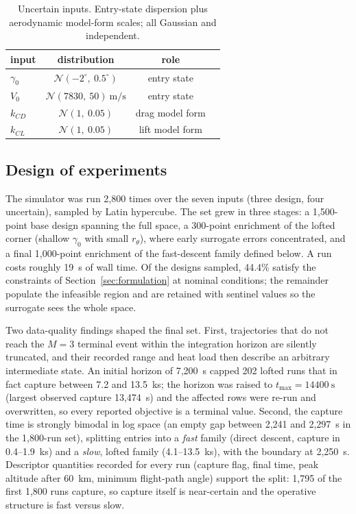 \begin{table}[htbp]
\centering
\caption{Uncertain inputs. Entry-state dispersion plus aerodynamic
model-form scales; all Gaussian and independent.}
\label{tab:uncert}
\begin{tabular}{lccl}
\toprule
input & distribution & role \\
\midrule
$\gamma_0$ & $\mathcal{N}(-2^\circ,\ 0.5^\circ)$ & entry state \\
$V_0$      & $\mathcal{N}(7830,\ 50)\ \si{\metre\per\second}$ & entry state \\
$k_{CD}$   & $\mathcal{N}(1,\ 0.05)$ & drag model form \\
$k_{CL}$   & $\mathcal{N}(1,\ 0.05)$ & lift model form \\
\bottomrule
\end{tabular}
\end{table}

\subsection{Design of experiments}
\label{sec:doe}

The simulator was run 2{,}800 times over the seven inputs (three design,
four uncertain), sampled by Latin hypercube. The set grew in three stages: a
1{,}500-point base design spanning the full space, a 300-point enrichment of
the lofted corner (shallow $\gamma_0$ with small $r_\theta$), where early
surrogate errors concentrated, and a final 1{,}000-point enrichment of the
fast-descent family defined below. A run costs roughly 19~s of wall time.
Of the designs sampled, 44.4\% satisfy the constraints of
Section~\ref{sec:formulation} at nominal conditions; the remainder populate
the infeasible region and are retained with sentinel values so the surrogate
sees the whole space.

Two data-quality findings shaped the final set. First, trajectories that do
not reach the $M=3$ terminal event within the integration horizon are
silently truncated, and their recorded range and heat load then describe an
arbitrary intermediate state. An initial horizon of 7{,}200~s capped 202
lofted runs that in fact capture between 7.2 and 13.5~ks; the horizon was
raised to $t_{\max}=\SI{14400}{\s}$ (largest observed capture 13{,}474~s)
and the affected rows were re-run and overwritten, so every reported
objective is a terminal value. Second, the capture time is strongly bimodal
in log space (an empty gap between 2{,}241 and 2{,}297~s in the 1{,}800-run
set), splitting entries into a \emph{fast} family (direct descent, capture
in 0.4--1.9~ks) and a \emph{slow}, lofted family (4.1--13.5~ks), with the
boundary at 2{,}250~s. Descriptor quantities recorded for every run (capture
flag, final time, peak altitude after 60~km, minimum flight-path angle)
support the split: 1{,}795 of the first 1{,}800 runs capture, so capture
itself is near-certain and the operative structure is fast versus slow.

